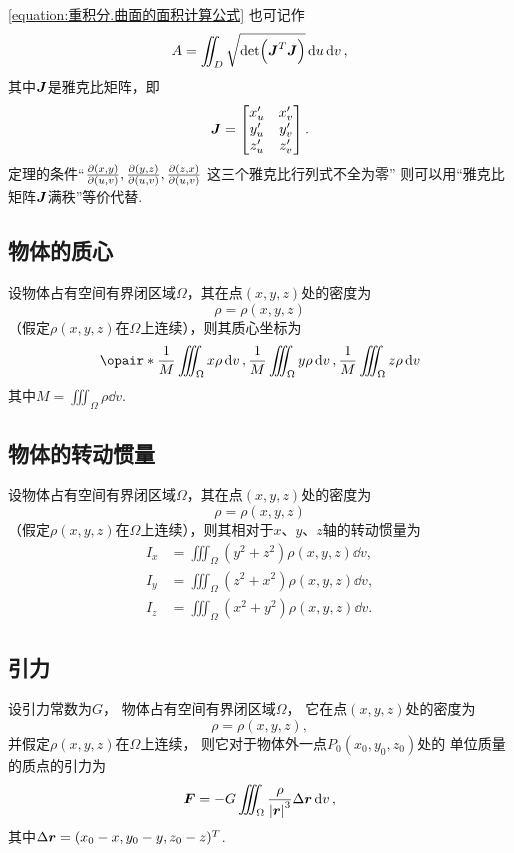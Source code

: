 \cref{equation:重积分.曲面的面积计算公式} 也可记作\[
	A = \iint_D \sqrt{\det(\boldsymbol{J}^T \boldsymbol{J})} \dd{u}\dd{v},
\]
其中\(\boldsymbol{J}\)是雅克比矩阵，即\[
	\boldsymbol{J} = \begin{bmatrix}
		x'_u & x'_v \\
		y'_u & y'_v \\
		z'_u & z'_v
	\end{bmatrix}.
\]
定理的条件“\(\pdv{ (x,y) }{ (u,v) },
\pdv{ (y,z) }{ (u,v) },
\pdv{ (z,x) }{ (u,v) }\)
这三个雅克比行列式不全为零”
则可以用“雅克比矩阵\(\boldsymbol{J}\)满秩”等价代替.

\subsection{物体的质心}
\begin{theorem}
设物体占有空间有界闭区域\(\Omega\)，其在点\((x,y,z)\)处的密度为\[
\rho=\rho(x,y,z)
\]（假定\(\rho(x,y,z)\)在\(\Omega\)上连续），则其质心坐标为\begin{equation}
\opair*{
\frac{1}{M} \iiint_{\Omega} x \rho \dd{v},
\frac{1}{M} \iiint_{\Omega} y \rho \dd{v},
\frac{1}{M} \iiint_{\Omega} z \rho \dd{v}
}
\end{equation}其中\(M = \iiint_{\Omega} \rho \dd{v}\).
\end{theorem}

\subsection{物体的转动惯量}
\begin{theorem}
设物体占有空间有界闭区域\(\Omega\)，其在点\((x,y,z)\)处的密度为\[
\rho=\rho(x,y,z)
\]（假定\(\rho(x,y,z)\)在\(\Omega\)上连续），则其相对于\(x\)、\(y\)、\(z\)轴的转动惯量为\begin{align}
I_x &= \iiint_{\Omega} (y^2+z^2) \rho(x,y,z) \dd{v}, \\
I_y &= \iiint_{\Omega} (z^2+x^2) \rho(x,y,z) \dd{v}, \\
I_z &= \iiint_{\Omega} (x^2+y^2) \rho(x,y,z) \dd{v}.
\end{align}
\end{theorem}

\subsection{引力}
\begin{theorem}
设引力常数为\(G\)，
物体占有空间有界闭区域\(\Omega\)，
它在点\((x,y,z)\)处的密度为\[
	\rho=\rho(x,y,z),
\]
并假定\(\rho(x,y,z)\)在\(\Omega\)上连续，
则它对于物体外一点\(P_0(x_0,y_0,z_0)\)处的
单位质量的质点的引力为\begin{equation}
	\boldsymbol{F}
	= -G \iiint_\Omega \frac{\rho}{\abs{\boldsymbol{r}}^3} \Delta\boldsymbol{r} \dd{v},
\end{equation}
其中\(\Delta\boldsymbol{r}
= (x_0-x,y_0-y,z_0-z)^T\).
\end{theorem}

